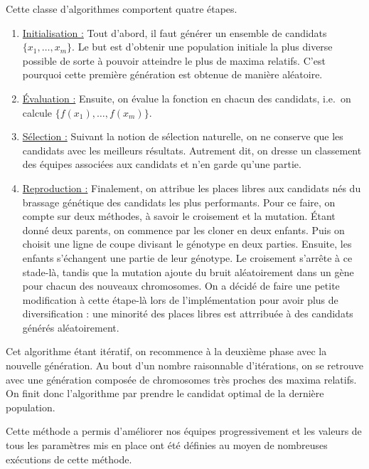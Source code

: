 \documentclass[12pt,a4paper]{article}
\begin{document}
Cette classe d'algorithmes comportent quatre \'etapes.

\begin{enumerate}
  \item \underline{Initialisation :} Tout d'abord, il faut g\'en\'erer un 
  ensemble de candidats $\{x_1,\dotsc,x_m\}$. Le but est d'obtenir une 
  population initiale la plus diverse possible de sorte \`a pouvoir atteindre 
le plus de maxima relatifs. C'est pourquoi cette premi\`ere g\'en\'eration est 
obtenue de mani\`ere al\'eatoire.
  \item \underline{\'Evaluation :} Ensuite, on \'evalue la fonction en 
  chacun des candidats, i.e.\ on calcule $\{f(x_1),\dotsc,f(x_m)\}$.
  \item \underline{S\'election :} Suivant la notion de s\'election 
  naturelle, on ne conserve que les candidats avec les meilleurs r\'esultats. 
  Autrement dit, on dresse un classement des \'equipes associ\'ees aux 
  candidats et n'en garde qu'une partie.
  \item \underline{Reproduction :} Finalement, on attribue les places 
  libres aux candidats n\'es du brassage g\'en\'etique des candidats les 
  plus performants. Pour ce faire, on compte sur deux m\'ethodes, \`a savoir le 
  croisement et la mutation. \'Etant donn\'e deux parents, on commence par les 
  cloner en deux enfants. Puis on choisit une ligne de coupe divisant le 
  g\'enotype en deux parties. Ensuite, les enfants s'\'echangent une partie de 
  leur g\'enotype. Le croisement s'arr\^ete \`a ce stade-l\`a, tandis que la 
  mutation ajoute du bruit al\'eatoirement dans un g\`ene pour chacun 
  des nouveaux chromosomes. On a d\'ecid\'e de faire une petite modification 
  \`a cette \'etape-l\`a lors de l'impl\'ementation pour avoir plus de 
  diversification : une minorit\'e des places libres est attrribu\'ee \`a des 
  candidats g\'en\'er\'es al\'eatoirement.
\end{enumerate}

Cet algorithme \'etant it\'eratif, on recommence \`a la deuxi\`eme phase avec 
la nouvelle g\'en\'eration. Au bout d'un nombre raisonnable d'it\'erations, on 
se retrouve avec une g\'en\'eration compos\'ee de chromosomes tr\`es proches 
des maxima relatifs. On finit donc l'algorithme par prendre le candidat optimal 
de la derni\`ere population.

Cette m\'ethode a permis d'am\'eliorer nos \'equipes progressivement et les 
valeurs de tous les param\`etres mis en place ont \'et\'e d\'efinies au moyen 
de nombreuses ex\'ecutions de cette m\'ethode.
\end{document}
